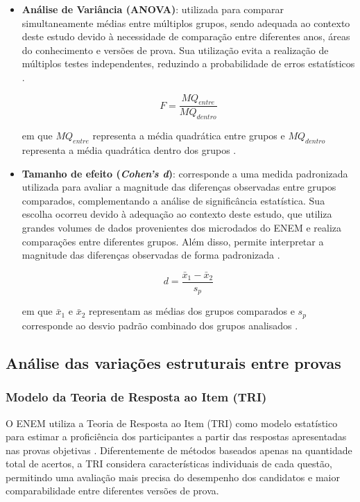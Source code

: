 \documentclass[a4paper,10pt, twocolumn]{article}
\begin{document}
\begin{itemize}

\item \textbf{Análise de Variância (ANOVA)}: utilizada para comparar simultaneamente médias entre múltiplos grupos, sendo adequada ao contexto deste estudo devido à necessidade de comparação entre diferentes anos, áreas do conhecimento e versões de prova. Sua utilização evita a realização de múltiplos testes independentes, reduzindo a probabilidade de erros estatísticos \cite{field2018discovering}.

\begin{equation}
F=
\frac{MQ_{entre}}
{MQ_{dentro}}
\end{equation}

em que $MQ_{entre}$ representa a média quadrática entre grupos e $MQ_{dentro}$ representa a média quadrática dentro dos grupos \cite{libretexts_anova}.

\item \textbf{Tamanho de efeito (\textit{Cohen's d})}: corresponde a uma medida padronizada utilizada para avaliar a magnitude das diferenças observadas entre grupos comparados, complementando a análise de significância estatística. Sua escolha ocorreu devido à adequação ao contexto deste estudo, que utiliza grandes volumes de dados provenientes dos microdados do ENEM e realiza comparações entre diferentes grupos. Além disso, permite interpretar a magnitude das diferenças observadas de forma padronizada \cite{cohen1988statistical}.

\begin{equation}
d=
\frac{\bar{x}_1-\bar{x}_2}
{s_p}
\end{equation}

em que $\bar{x}_1$ e $\bar{x}_2$ representam as médias dos grupos comparados e $s_p$ corresponde ao desvio padrão combinado dos grupos analisados \cite{jim_cohensd}.

\end{itemize}

\subsection{Análise das variações estruturais entre provas} 
\subsubsection{Modelo da Teoria de Resposta ao Item (TRI)}
\label{sec:tri}

O ENEM utiliza a Teoria de Resposta ao Item (TRI) como modelo estatístico para estimar a proficiência dos participantes a partir das respostas apresentadas nas provas objetivas \cite{inep2021enem}. Diferentemente de métodos baseados apenas na quantidade total de acertos, a TRI considera características individuais de cada questão, permitindo uma avaliação mais precisa do desempenho dos candidatos e maior comparabilidade entre diferentes versões de prova.
\end{document}
